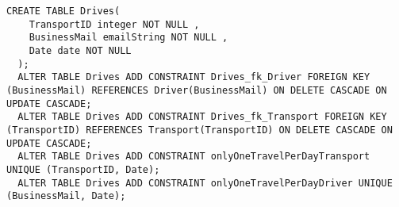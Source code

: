 \newpage

\begin{lstlisting}[caption={Creazione della tabella \textbf{Drives}}]
  CREATE TABLE Drives(
    TransportID integer NOT NULL ,
    BusinessMail emailString NOT NULL ,
    Date date NOT NULL
  );
  ALTER TABLE Drives ADD CONSTRAINT Drives_fk_Driver FOREIGN KEY (BusinessMail) REFERENCES Driver(BusinessMail) ON DELETE CASCADE ON UPDATE CASCADE;
  ALTER TABLE Drives ADD CONSTRAINT Drives_fk_Transport FOREIGN KEY (TransportID) REFERENCES Transport(TransportID) ON DELETE CASCADE ON UPDATE CASCADE;
  ALTER TABLE Drives ADD CONSTRAINT onlyOneTravelPerDayTransport UNIQUE (TransportID, Date);
  ALTER TABLE Drives ADD CONSTRAINT onlyOneTravelPerDayDriver UNIQUE (BusinessMail, Date);
\end{lstlisting}
